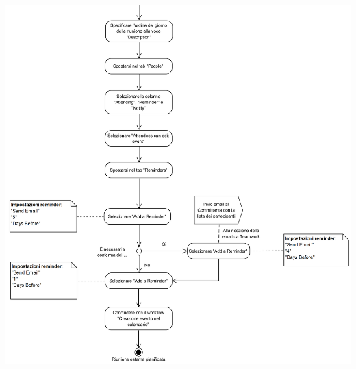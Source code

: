 \begin{center}
	\includegraphics[width=15cm]{../../documenti/NormeDiProgetto/DiagrammiProcedure/RiunioneEsterna2.png}
\end{center}

